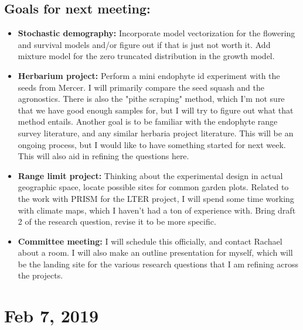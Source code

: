 \documentclass{article}
\begin{document}
\subsection*{Goals for next meeting:}
\begin{itemize}
\item{\textbf{Stochastic demography:} Incorporate model vectorization for the flowering and survival models and/or figure out if that is just not worth it. Add mixture model for the zero truncated distribution in the growth model.}
\item{\textbf{Herbarium project:} Perform a mini endophyte id experiment with the seeds from Mercer. I will primarily compare the seed squash and the agronostics. There is also the "pithe scraping" method, which I'm not sure that we have good enough samples for, but I will try to figure out what that method entails. 
Another goal is to be familiar with the endophyte range survey literature, and any similar herbaria project literature. This will be an ongoing process, but I would like to have something started for next week. This will also aid in refining the questions here.}
\item{\textbf{Range limit project:} Thinking about the experimental design in actual geographic space, locate possible sites for common garden plots. Related to the work with PRISM for the LTER project, I will spend some time working with climate maps, which I haven't had a ton of experience with. 
Bring draft 2 of the research question, revise it to be more specific.}
\item{\textbf{Committee meeting:} I will schedule this officially, and contact Rachael about a room. I will also make an outline presentation for myself, which will be the landing site for the various research questions that I am refining across the projects.}
\end{itemize}


\section*{Feb 7, 2019}
\end{document}
